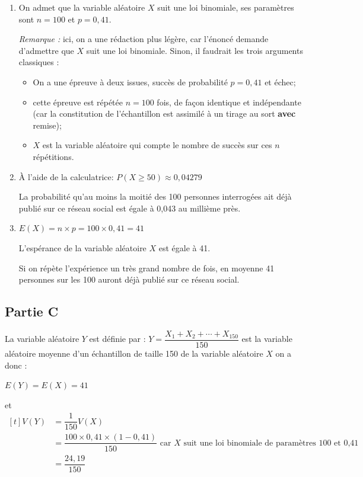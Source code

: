 \documentclass[10pt]{article}
\begin{document}
\begin{enumerate}
	\item On admet que la variable aléatoire $X$ suit une loi binomiale, ses  paramètres sont $n=100$ et  $p=0,41$.

	\emph{Remarque :} ici, on a une rédaction plus légère, car l'énoncé demande d'admettre que $X$ suit une loi binomiale. Sinon, il faudrait les trois arguments classiques :

	\begin{itemize}
		\item On a une épreuve à deux issues, succès de probabilité $p = 0,41$ et échec;
		\item cette épreuve est répétée $n = 100$ fois, de façon identique et indépendante (car la constitution de l'échantillon est assimilé à un tirage au sort \textbf{avec} remise);
		\item $X$ est la variable aléatoire qui compte le nombre de succès sur ces $n$ répétitions.
	\end{itemize}

	\item À l'aide de la calculatrice: $P(X \geq 50) \approx 0,04279 $

	La probabilité qu'au moins la moitié des 100 personnes interrogées ait déjà publié sur ce réseau social est égale à   0,043 au millième près.

	\item  $E(X) = n\times p = 100 \times 0,41 =41$

	L'espérance de la variable aléatoire $X$ est égale à 41.

	Si on répète l'expérience un très grand nombre de fois, en moyenne 41 personnes sur les 100 auront déjà publié sur ce réseau social.
\end{enumerate}

\subsection*{Partie C}


La variable aléatoire $Y$ est définie par :
$Y=\dfrac{X_{1}+X_{2}+\cdots+X_{150}}{150}$ est la variable aléatoire  moyenne d'un échantillon  de taille 150 de la variable aléatoire $X$ on a donc :



$E\left(Y\right) = E(X)= 41$

et   $\begin{aligned}[t] V\left(Y\right) &= \dfrac{1}{150} V(X)\\
	&  =  \dfrac{100 \times 0,41 \times (1-0,41)}{150} \text{ car } X \text{ suit une loi binomiale de paramètres 100 et 0,41}\\
	&= \dfrac{24,19}{150}
\end{aligned} $
\end{document}
